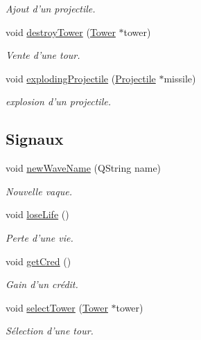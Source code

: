 \begin{DoxyCompactItemize}
\begin{DoxyCompactList}\small\item\em Ajout d'un projectile. \end{DoxyCompactList}\item 
void \hyperlink{classRender_a20678c257926bfff635fded745e11f4a}{destroyTower} (\hyperlink{classTower}{Tower} $\ast$tower)
\begin{DoxyCompactList}\small\item\em Vente d'une tour. \end{DoxyCompactList}\item 
void \hyperlink{classRender_aedec0cbbe4808368656b772dfe3e63f9}{explodingProjectile} (\hyperlink{classProjectile}{Projectile} $\ast$missile)
\begin{DoxyCompactList}\small\item\em explosion d'un projectile. \end{DoxyCompactList}\end{DoxyCompactItemize}
\subsection*{Signaux}
\begin{DoxyCompactItemize}
\item 
void \hyperlink{classRender_a916c15ab4b31cc0f34d9d53b89b89ac0}{newWaveName} (QString name)
\begin{DoxyCompactList}\small\item\em Nouvelle vaque. \end{DoxyCompactList}\item 
void \hyperlink{classRender_ad88f7f01a7b9fafa756221707d590a78}{loseLife} ()
\begin{DoxyCompactList}\small\item\em Perte d'une vie. \end{DoxyCompactList}\item 
void \hyperlink{classRender_acd71f1c6c9d67dff3627da4ff6a4c9b8}{getCred} ()
\begin{DoxyCompactList}\small\item\em Gain d'un crédit. \end{DoxyCompactList}\item 
void \hyperlink{classRender_a126c4b49e93103a751f66359d8e63171}{selectTower} (\hyperlink{classTower}{Tower} $\ast$tower)
\begin{DoxyCompactList}\small\item\em Sélection d'une tour. \end{DoxyCompactList}\end{DoxyCompactItemize}
